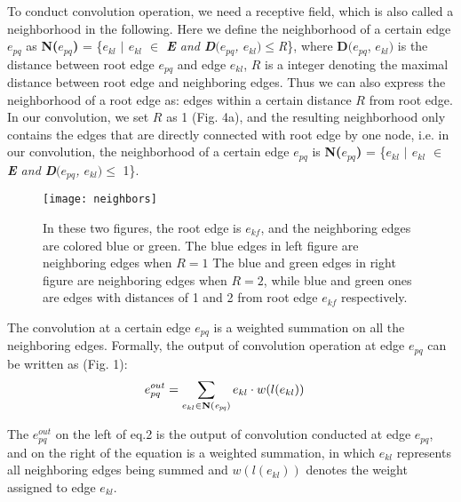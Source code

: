 \documentclass[a4paper,11pt]{article}
\begin{document}
To conduct convolution operation, we need a receptive field, which is also called a neighborhood in the following. Here we define the neighborhood of a certain edge $e_{pq}$ as
{\bf  N({\it $e_{pq}$})} = \{{\it $e_{kl}$ $|$ $e_{kl}$ $\in$ {\bf E} and {\bf D}$(e_{pq}$, $e_{kl})$$\leqslant$R}\}, where {\bf D}$(e_{pq}$, $e_{kl})$ is the distance between root edge $e_{pq}$ and edge $e_{kl}$, $R$ is a integer denoting the maximal distance between root edge and neighboring edges.   Thus we can also express the neighborhood of a root edge as: edges within a certain distance $R$ from root edge. In our convolution, we set $R$ as 1 (Fig. 4a), and the resulting neighborhood only contains the edges that are directly connected with root edge by one node, i.e. in our convolution, the neighborhood of a certain edge $e_{pq}$ is {\bf  N({\it $e_{pq}$})} = \{{{\it $e_{kl}$ $|$ $e_{kl}$ $\in$ {\bf E} and {\bf D}$(e_{pq}$, $e_{kl})$$\leqslant$} 1}\}.



\begin{figure}
\centering
\texttt{[image: neighbors]}
\caption{In these two figures, the root edge is $e_{kf}$, and the neighboring edges are colored blue or green. The blue edges in left figure are neighboring edges when $R=1$ The blue and green edges in right figure are neighboring edges when $R=2$, while blue and green ones are edges with distances of 1 and 2 from root edge $e_{kf}$ respectively.}
\label{fig:example}
\end{figure}


The convolution at a certain edge $e_{pq}$ is a weighted summation on all the neighboring edges. Formally, the output of convolution operation at edge $e_{pq}$ can be written as (Fig. 1):
\begin{align}
&e_{pq}^{out} = \sum_{e_{kl} \in {\bf N({\it e_{pq}})}} e_{kl} \cdot w(l(e_{kl}))&
\end{align}

The  $e_{pq}^{out}$ on the left of eq.2 is the output of convolution conducted at edge $e_{pq}$, and on the right of the equation is a weighted summation, in which $e_{kl}$ represents all neighboring edges being summed and $w(l(e_{kl}))$ denotes the weight assigned to edge $e_{kl}$.
\end{document}
